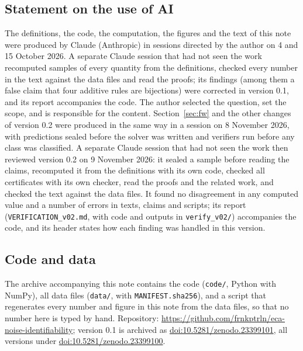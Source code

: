 \documentclass[11pt,a4paper]{article}
\theoremstyle{remark}
\begin{document}
\subsection*{Statement on the use of AI}
The definitions, the code, the computation, the figures and the text of this note were produced by Claude (Anthropic) in sessions directed by the author on 4 and 15 October 2026. A separate Claude session that had not seen the work recomputed samples of every quantity from the definitions, checked every number in the text against the data files and read the proofs; its findings (among them a false claim that four additive rules are bijections) were corrected in version 0.1, and its report accompanies the code. The author selected the question, set the scope, and is responsible for the content. Section~\ref{sec:fw} and the other changes of version 0.2 were produced in the same way in a session on 8 November 2026, with predictions sealed before the solver was written and verifiers run before any class was classified. A separate Claude session that had not seen the work then reviewed version 0.2 on 9 November 2026: it sealed a sample before reading the claims, recomputed it from the definitions with its own code, checked all certificates with its own checker, read the proofs and the related work, and checked the text against the data files. It found no disagreement in any computed value and a number of errors in texts, claims and scripts; its report (\texttt{VERIFICATION\_v02.md}, with code and outputs in \texttt{verify\_v02/}) accompanies the code, and its header states how each finding was handled in this version.

\subsection*{Code and data}
The archive accompanying this note contains the code (\texttt{code/}, Python with NumPy), all data files (\texttt{data/}, with \texttt{MANIFEST.sha256}), and a script that regenerates every number and figure in this note from the data files, so that no number here is typed by hand. Repository: \url{https://github.com/frnkptrln/eca-noise-identifiability}; version 0.1 is archived as \href{https://doi.org/10.5281/zenodo.23399101}{doi:10.5281/zenodo.23399101}, all versions under \href{https://doi.org/10.5281/zenodo.23399100}{doi:10.5281/zenodo.23399100}.
\end{document}
